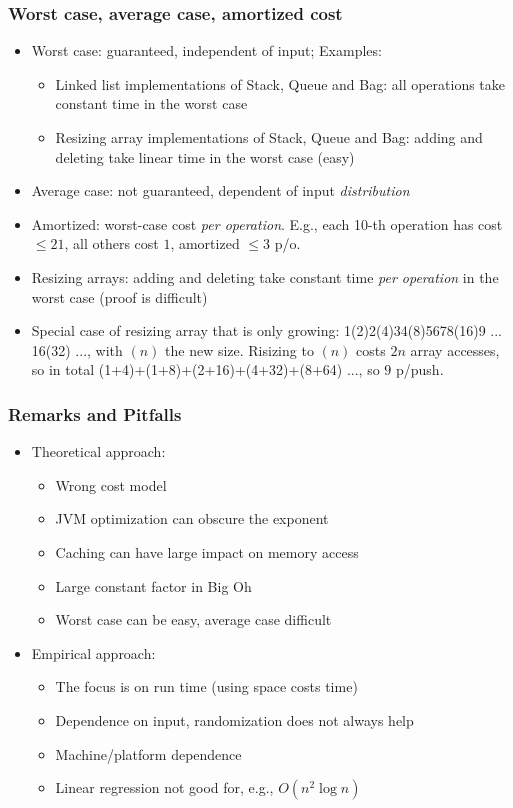 \documentclass[handout]{beamer}
\begin{document}
\frame
  {
    
    \frametitle{Worst case, average case, amortized cost}

\begin{itemize}[<+->]

\item Worst case: guaranteed, independent of input; Examples:
  \begin{itemize}
  \item Linked list implementations of Stack, Queue and Bag: all operations
  take constant time in the worst case
  \item Resizing array implementations of Stack, Queue and Bag: adding and deleting
  take linear time in the worst case (easy)
  \end{itemize}
\item Average case: not guaranteed, dependent of input \emph{distribution}
\item Amortized: worst-case cost  \emph{per operation}. 
E.g., each 10-th operation has cost $\leq 21$, all others cost $1$, 
amortized $\leq 3$ p/o.
\item Resizing arrays: adding and deleting
take constant time \emph{per operation} in the worst case (proof is difficult)
\item Special case of resizing array that is only growing: 
         1(2)2(4)34(8)5678(16)9 ... 16(32) ..., with $(n)$ the new size.
         Risizing to $(n)$ costs $2n$ array accesses, so in total
         (1+4)+(1+8)+(2+16)+(4+32)+(8+64) ..., so $9$ p/push.
                 
\end{itemize}  
}

\begin{frame}

    \frametitle{Remarks and Pitfalls}

\begin{itemize}[<+->]
\item Theoretical approach:
  \begin{itemize}
  \item Wrong cost model
  \item JVM optimization can obscure the exponent
  \item Caching can have large impact on memory access
  \item Large constant factor in Big Oh
  \item Worst case can be easy, average case difficult
  \end{itemize}
\item Empirical approach:
  \begin{itemize}
  \item The focus is on run time (using space costs time)
  \item Dependence on input, randomization does not always help
  \item Machine/platform dependence
  \item Linear regression not good for, e.g., $O(n^2 \log n)$
  \end{itemize}
\end{itemize}     

\end{frame}
\end{document}
